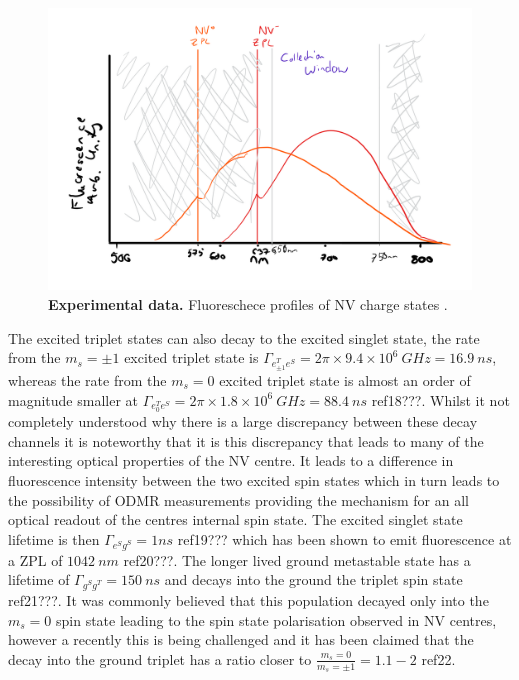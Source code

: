 \documentclass[preprint,prl]{revtex4}
\begin{document}
\begin{figure}[t]
  \centering
  \includegraphics[width=1\textwidth]{Fluoro.png} 
 \caption{\textbf{Experimental data.} Fluoreschece profiles of NV charge states .} \label{FigFluoro}
\end{figure}

The excited triplet states can also decay to the excited singlet state, the rate from the $m_s=\pm1$ excited triplet state is $\Gamma_{e^T_{\pm1}e^S} = 2\pi\times9.4\times10^6\SI{}{GHz} = \SI{16.9}{ns}$, whereas the rate from the $m_s=0$ excited triplet state is almost an order of magnitude smaller at $\Gamma_{e^T_{0}e^S} = 2\pi\times1.8\times10^6 \SI{}{GHz} = \SI{88.4}{ns}$ ref18???. Whilst it not completely understood why there is a large discrepancy between these decay channels it is noteworthy that it is this discrepancy that leads to many of the interesting optical properties of the NV centre. It leads to a difference in fluorescence intensity between the two excited spin states which in turn leads to the possibility of ODMR measurements providing the mechanism for an all optical readout of the centres internal spin state. The excited singlet state lifetime is then $\Gamma_{e^Sg^S} = \si{1}{ns}$ ref19??? which has been shown to emit fluorescence at a ZPL of $\SI{1042}{nm}$ ref20???. The longer lived ground metastable state has a lifetime of $\Gamma_{g^Sg^T} = \SI{150}{ns}$ and decays into the ground the triplet spin state ref21???. It was commonly believed that this population decayed only into the $m_s=0$ spin state leading to the spin state polarisation observed in NV centres, however a recently this is being challenged and it has been claimed that the decay into the ground triplet has a ratio closer to $\frac{m_s=0}{m_s=\pm1} = 1.1-2$ ref22. 
\end{document}
